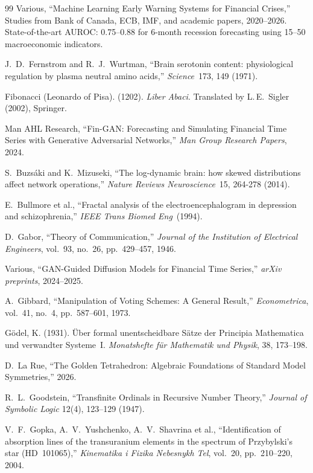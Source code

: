 \documentclass[12pt,oneside]{book}
\theoremstyle{principia}
\theoremstyle{definition}
\theoremstyle{remark}
\begin{document}
\begin{thebibliography}{99}
Various,
``Machine Learning Early Warning Systems for Financial Crises,''
Studies from Bank of Canada, ECB, IMF, and academic papers, 2020--2026.
State-of-the-art AUROC: 0.75--0.88 for 6-month recession forecasting using 15--50 macroeconomic indicators.

J.~D.~Fernstrom and R.~J.~Wurtman, ``Brain serotonin content: physiological regulation by plasma neutral amino acids,'' \emph{Science}\ 173, 149 (1971).

Fibonacci (Leonardo of Pisa). (1202). \emph{Liber Abaci}. Translated by L.\,E.\ Sigler (2002), Springer.

Man AHL Research,
``Fin-GAN: Forecasting and Simulating Financial Time Series with Generative Adversarial Networks,''
\emph{Man Group Research Papers}, 2024.

S.~Buzs\'aki and K.~Mizuseki, ``The log-dynamic brain: how skewed distributions affect network operations,'' \emph{Nature Reviews Neuroscience}\ 15, 264-278 (2014).

E.~Bullmore et al., ``Fractal analysis of the electroencephalogram in depression and schizophrenia,'' \emph{IEEE Trans Biomed Eng}\ (1994).

D.~Gabor,
``Theory of Communication,''
\emph{Journal of the Institution of Electrical Engineers}, vol.~93, no.~26, pp.~429--457, 1946.

Various,
``GAN-Guided Diffusion Models for Financial Time Series,''
\emph{arXiv preprints}, 2024--2025.

A.~Gibbard,
``Manipulation of Voting Schemes: A General Result,''
\emph{Econometrica}, vol.~41, no.~4, pp.~587--601, 1973.

G\"odel, K. (1931). \"Uber formal unentscheidbare S\"atze der Principia Mathematica und verwandter Systeme~I. \emph{Monatshefte f\"ur Mathematik und Physik}, 38, 173--198.

D.~La Rue,
``The Golden Tetrahedron: Algebraic Foundations of Standard Model Symmetries,''
2026.

R.~L.~Goodstein,
``Transfinite Ordinals in Recursive Number Theory,''
\emph{Journal of Symbolic Logic} 12(4), 123--129 (1947).

V.~F.~Gopka, A.~V.~Yushchenko, A.~V.~Shavrina et al.,
``Identification of absorption lines of the transuranium elements in the spectrum of Przybylski's star (HD~101065),''
\emph{Kinematika i Fizika Nebesnykh Tel}, vol.~20, pp.~210--220, 2004.


\end{thebibliography}
\end{document}
